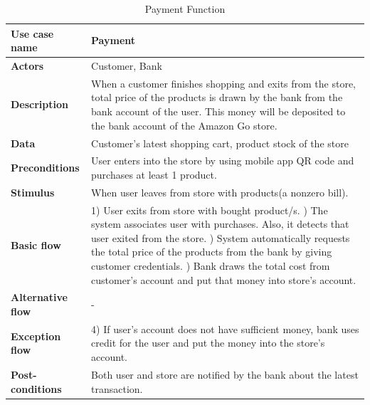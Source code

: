  \begin{table}[H]
     \centering
     \begin{tabular}{ | l | p{10cm} |}
     \hline
     \textbf{Use case name}    & Payment \\
     \hline
     \textbf{Actors}           & Customer, Bank \\
     \hline
     \textbf{Description}      & When a customer finishes shopping and exits from the store, total price of the products is drawn by the bank from the bank account of the user. This money will be deposited to the bank account of the Amazon Go store.  \\
     \hline
     \textbf{Data}             & Customer's latest shopping cart, product stock of the store \\
     \hline
     \textbf{Preconditions}    & User enters into the store by using mobile app QR code and purchases at least 1 product. \\
     \hline
     \textbf{Stimulus}         & When user leaves from store with products(a nonzero bill). \\
     \hline
     \textbf{Basic flow}       & 1) User exits from store with bought product/s. \newline 2) The system associates user with purchases. Also, it detects that user exited from the store. \newline 3) System automatically requests the total price of the products from the bank by giving customer credentials. \newline 4) Bank draws the total cost from customer's account and put that money into store's account.\\
     \hline
     \textbf{Alternative flow} & - \\
     \hline
     \textbf{Exception flow}   & 4) If user's account does not have sufficient money, bank uses credit for the user and put the money into the store's account. \\
     \hline
     \textbf{Post-conditions}  & Both user and store are notified by the bank about the latest transaction. \\
     \hline
     \end{tabular} \caption{Payment Function}
     \label{tab:05payment}
 \end{table}

